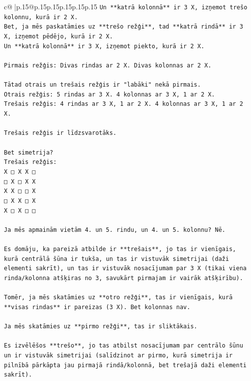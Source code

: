 \documentclass{article}
\begin{document}
{\begin{supertabular}{c@{$\;$}|p{.15\linewidth}@{}p{.15\linewidth}p{.15\linewidth}p{.15\linewidth}p{.15\linewidth}p{.15\linewidth}}
{{{\texttt{Un **katrā kolonnā** ir 3 X, izņemot trešo kolonnu, kurā ir 2 X.} \\
\texttt{Bet, ja mēs paskatāmies uz **trešo režģi**, tad **katrā rindā** ir 3 X, izņemot pēdējo, kurā ir 2 X.} \\
\texttt{Un **katrā kolonnā** ir 3 X, izņemot piekto, kurā ir 2 X.} \\
\\ 
\texttt{Pirmais režģis: Divas rindas ar 2 X. Divas kolonnas ar 2 X.} \\
\\ 
\texttt{Tātad otrais un trešais režģis ir "labāki" nekā pirmais.} \\
\texttt{Otrais režģis: 5 rindas ar 3 X. 4 kolonnas ar 3 X, 1 ar 2 X.} \\
\texttt{Trešais režģis: 4 rindas ar 3 X, 1 ar 2 X. 4 kolonnas ar 3 X, 1 ar 2 X.} \\
\\ 
\texttt{Trešais režģis ir līdzsvarotāks.} \\
\\ 
\texttt{Bet simetrija?} \\
\texttt{Trešais režģis:} \\
\texttt{X □ X X □} \\
\texttt{□ X □ X X} \\
\texttt{X X □ □ X} \\
\texttt{□ X X □ X} \\
\texttt{X □ X □ □} \\
\\ 
\texttt{Ja mēs apmainām vietām 4. un 5. rindu, un 4. un 5. kolonnu? Nē.} \\
\\ 
\texttt{Es domāju, ka pareizā atbilde ir **trešais**, jo tas ir vienīgais, kurā centrālā šūna ir tukša, un tas ir vistuvāk simetrijai (daži elementi sakrīt), un tas ir vistuvāk nosacījumam par 3 X (tikai viena rinda/kolonna atšķiras no 3, savukārt pirmajam ir vairāk atšķirību).} \\
\\ 
\texttt{Tomēr, ja mēs skatāmies uz **otro režģi**, tas ir vienīgais, kurā **visas rindas** ir pareizas (3 X). Bet kolonnas nav.} \\
\\ 
\texttt{Ja mēs skatāmies uz **pirmo režģi**, tas ir sliktākais.} \\
\\ 
\texttt{Es izvēlēšos **trešo**, jo tas atbilst nosacījumam par centrālo šūnu un ir vistuvāk simetrijai (salīdzinot ar pirmo, kurā simetrija ir pilnībā pārkāpta jau pirmajā rindā/kolonnā, bet trešajā daži elementi sakrīt).} \\
}}}
\end{supertabular}}
\end{document}
